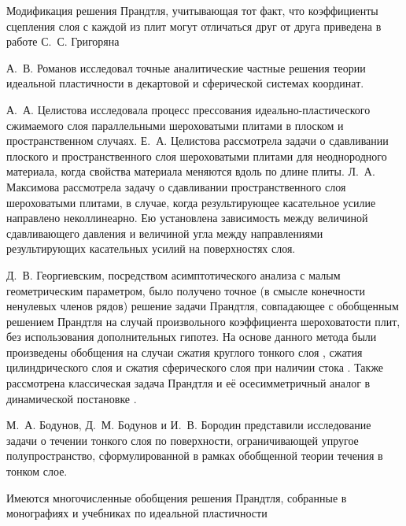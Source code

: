 Модификация решения Прандтля, учитывающая тот факт, что коэффициенты сцепления слоя с каждой из плит могут отличаться друг от друга приведена в работе С.~С. Григоряна \autocite{Grigoryan:1981} 

А.~В. Романов \autocite{Romanov:1982,Romanov:1984} исследовал точные аналитические частные решения теории идеальной пластичности в декартовой и сферической системах координат.

А.~А. Целистова \autocite{Tselistova:1999} исследовала процесс прессования идеально-пластического сжимаемого слоя параллельными шероховатыми плитами в плоском и пространственном случаях.
Е.~А. Целистова \autocite{Tselistova:2000} рассмотрела задачи о сдавливании плоского и пространственного слоя шероховатыми плитами для неоднородного материала, когда свойства материала меняются вдоль по длине плиты.
Л.~А. Максимова \autocite{Maximova:1999} рассмотрела задачу о сдавливании пространственного слоя шероховатыми плитами, в случае, когда результирующее касательное усилие направлено неколлинеарно. Ею установлена зависимость между величиной сдавливающего давления и величиной угла между направлениями результирующих касательных усилий на поверхностях слоя.

Д.~В. Георгиевским, посредством асимптотического анализа с малым геометрическим параметром, было получено точное (в смысле конечности ненулевых членов рядов) решение \autocite{Georgievsky:2009} задачи Прандтля, совпадающее с обобщенным решением Прандтля на случай произвольного коэффициента шероховатости плит, без использования дополнительных гипотез. На основе данного метода были произведены обобщения на случаи сжатия круглого тонкого слоя \autocite{Georgievsky:2008}, сжатия цилиндрического слоя \autocite{Georgievsky:2010} и сжатия сферического слоя при наличии стока \autocite{Georgievsky:2011}. Также рассмотрена классическая задача Прандтля и её осесимметричный аналог в динамической постановке \autocite{Georgievsky:2013}.

М.~А. Бодунов, Д.~М. Бодунов и И.~В. Бородин \autocite{Bodunov:2013} представили исследование задачи о течении тонкого слоя по поверхности, ограничивающей упругое полупространство, сформулированной в рамках обобщенной теории течения в тонком слое.

Имеются многочисленные обобщения решения Прандтля, собранные в монографиях и учебниках по идеальной пластичности \autocite{Bikovcev:1998, Browman:1965, Gromov:1978, Gubkin:1959, Hill:1956, Ishlinsky:2001, Ivlev:2001, Ivlev:2002, Kachanov:1969, Kolmogorov:2001, Korolev:1969, Mihin:1968, Nadai:1954, Pavlov:1950, Perlin:1964, Prager:1956, Sokolovskiy:1969, Storozhev:1977, Tarnovsky:1963, Tomlenov:1963, Tomlenov:1972, Tomsen:1965, Tselikov:1965, Tselikov:1965, Unksov:1955, Zadoyan:1992}

